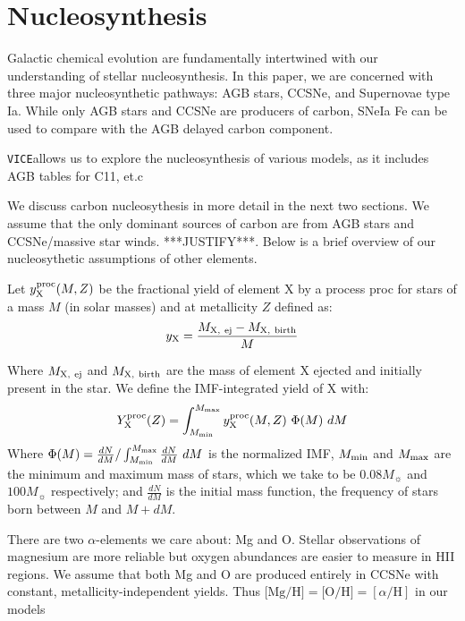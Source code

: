 \documentclass[fleqn,usenatbib]{mnras}
\newcommand{\VICE}{\texttt{VICE}}
\begin{document}
\section{Nucleosynthesis}

Galactic chemical evolution are fundamentally intertwined with our understanding of stellar nucleosynthesis. In this paper, we are concerned with three major nucleosynthetic pathways: AGB stars, CCSNe, and Supernovae type Ia. While only AGB stars and CCSNe are producers of carbon, SNeIa Fe can be used to compare with the AGB delayed carbon component. 

\VICE allows us to explore the nucleosynthesis of various models, as it includes AGB tables for C11, et.c
    
We discuss carbon nucleosythesis in more detail in the next two sections. We assume that the only dominant sources of carbon are from AGB stars and CCSNe/massive star winds. ***JUSTIFY***. Below  is a brief overview of our  nucleosythetic assumptions of other elements.

Let $y_{\rm X}^{\rm proc}(M, Z)$ be the fractional yield of element X by a process proc for stars of a mass $M$ (in solar masses) and at metallicity $Z$ defined as: 
\begin{equation}
    y_{\rm X} = \frac{M_{\rm X,\ ej} - M_{\rm X,\ birth}}{M}   
\end{equation}

Where $M_{\rm X,\ ej}$ and $M_{\rm X,\ birth}$ are the mass of element X ejected and initially present in the star. 
We define the IMF-integrated yield of X with: 
\begin{equation}
Y_{\rm X}^{\rm proc}(Z) = \int_{M_{\rm min}}^{M_{\rm max}} y_{\rm X}^{\rm proc}(M, Z)\ \Phi(M)  \ dM
\end{equation}
Where $\Phi(M) = \frac{dN}{dM}/ \int_{M_{\rm min}}^{M_{\rm max}} \frac{dN}{dM}\ dM$ is the normalized IMF, $M_{\rm min}$ and $M_{\rm max}$ are the minimum and maximum mass of stars, which we take to be $0.08 M_{\sun}$ and $100 M_{\sun}$ respectively; and $\frac{dN}{dM}$ is the initial mass function, the frequency of stars born between $M$ and $M+dM$.

There are two $\alpha$-elements we care about: Mg and O. Stellar observations of magnesium are more reliable but oxygen abundances are easier to measure in HII regions. We assume that both Mg and O are produced entirely in CCSNe with constant, metallicity-independent yields. Thus $\text{[Mg/H]} = \text{[O/H]} = [\alpha/\text{H}]$ in our models
\end{document}
